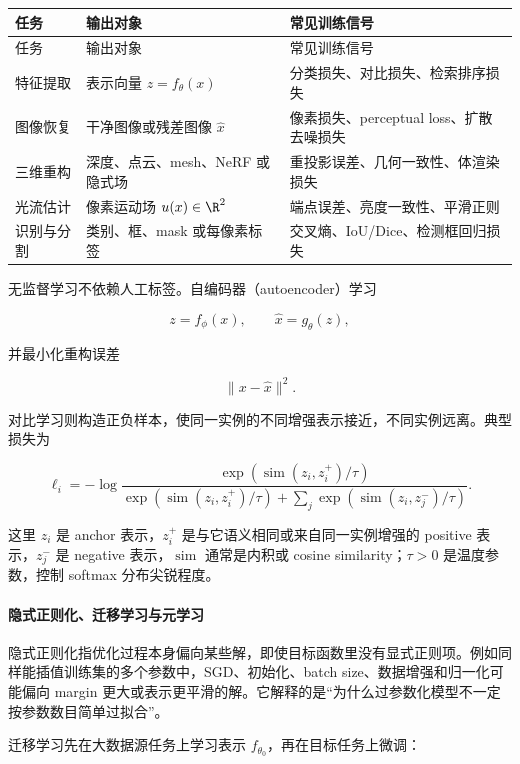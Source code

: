 \begingroup
\small
\begin{longtable}{L{0.22\textwidth}L{0.35\textwidth}L{0.32\textwidth}}
\toprule
任务 & 输出对象 & 常见训练信号 \\
\midrule
\endfirsthead
\toprule
任务 & 输出对象 & 常见训练信号 \\
\midrule
\endhead
特征提取 & 表示向量 \(z=f_\theta(x)\) & 分类损失、对比损失、检索排序损失 \\
图像恢复 & 干净图像或残差图像 \(\hat x\) & 像素损失、perceptual loss、扩散去噪损失 \\
三维重构 & 深度、点云、mesh、NeRF 或隐式场 & 重投影误差、几何一致性、体渲染损失 \\
光流估计 & 像素运动场 \(u(x)\in\R^2\) & 端点误差、亮度一致性、平滑正则 \\
识别与分割 & 类别、框、mask 或每像素标签 & 交叉熵、IoU/Dice、检测框回归损失 \\
\bottomrule
\end{longtable}
\endgroup

无监督学习不依赖人工标签。自编码器（autoencoder）学习

\[
  z=f_\phi(x),
  \qquad
  \hat x=g_\theta(z),
\]

并最小化重构误差

\[
  \|x-\hat x\|^2.
\]

对比学习则构造正负样本，使同一实例的不同增强表示接近，不同实例远离。典型损失为

\[
  \ell_i
  =
  -
  \log
  \frac{
    \exp(\operatorname{sim}(z_i,z_i^+)/\tau)
  }{
    \exp(\operatorname{sim}(z_i,z_i^+)/\tau)
    +
    \sum_{j}
    \exp(\operatorname{sim}(z_i,z_j^-)/\tau)
  }.
\]

这里 \(z_i\) 是 anchor 表示，\(z_i^+\) 是与它语义相同或来自同一实例增强的 positive 表示，\(z_j^-\) 是 negative 表示，\(\operatorname{sim}\) 通常是内积或 cosine similarity；\(\tau>0\) 是温度参数，控制 softmax 分布尖锐程度。

\paragraph{隐式正则化、迁移学习与元学习}

隐式正则化指优化过程本身偏向某些解，即使目标函数里没有显式正则项。例如同样能插值训练集的多个参数中，SGD、初始化、batch size、数据增强和归一化可能偏向 margin 更大或表示更平滑的解。它解释的是“为什么过参数化模型不一定按参数数目简单过拟合”。

迁移学习先在大数据源任务上学习表示 \(f_{\theta_0}\)，再在目标任务上微调：

